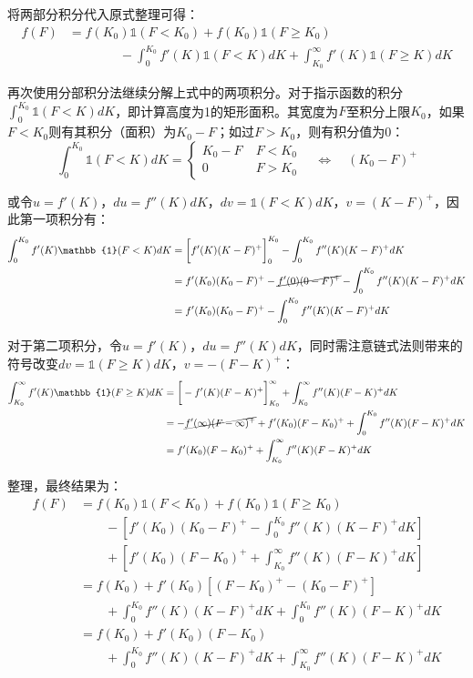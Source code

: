 \documentclass[11pt]{article}
\begin{document}
将两部分积分代入原式整理可得：
\begin{align*}
    f(F) &=  f(K_0)\mathbb{1}(F<K_0) + f(K_0)\mathbb{1}(F \geq K_0) \\
    &\hspace{4em} - \int^{K_0}_{0} f'(K) \mathbb{1}(F<K) dK 
    + \int^{\infty}_{K_0} f'(K) \mathbb{1}(F \geq K) dK
\end{align*}

再次使用分部积分法继续分解上式中的两项积分。对于指示函数的积分$\int^{K_0}_{0}\mathbb{1}(F<K) dK$，即计算高度为1的矩形面积。其宽度为$F$至积分上限$K_0$，如果$F<K_0$则有其积分（面积）为$K_0-F$；如过$F>K_0$，则有积分值为0：
\begin{equation*}
    \int^{K_0}_{0}\mathbb{1}(F<K) dK =
    \begin{cases}
        K_0 - F \; & F<K_0 \\
        0 \; & F>K_0
    \end{cases}
    \quad \Leftrightarrow \quad
    (K_0 - F)^+
\end{equation*}

或令$u=f'(K)$，$du=f''(K)dK$，$dv=\mathbb{1}(F<K)dK$，$v=(K-F)^+$，因此第一项积分有：
\begin{align*}
    \int^{K_0}_{0} f'(K) \mathbb{1}(F<K) dK 
    &= \bigg[ f'(K)(K-F)^+ \bigg]^{K_0}_{0} - \int^{K_0}_{0} f''(K) (K-F)^+ dK \\
    &= f'(K_0)(K_0-F)^+ - \cancel{f'(0)(0-F)^+} - \int^{K_0}_{0} f''(K) (K-F)^+ dK \\
    &= f'(K_0)(K_0 - F)^+ - \int^{K_0}_{0} f''(K) (K-F)^+ dK
\end{align*}

对于第二项积分，令$u=f'(K)$，$du=f''(K)dK$，同时需注意链式法则带来的符号改变$dv=\mathbb{1}(F \geq K)dK$，$v=-(F-K)^+$：
\begin{align*}
    \int^{\infty}_{K_0} f'(K) \mathbb{1}(F\geq K) dK 
    &= \bigg[ -f'(K)(F-K)^+ \bigg]^{\infty}_{K_0} + \int^{\infty}_{K_0} f''(K) (F-K)^+ dK \\
    &= - \cancel{f'(\infty)(F - \infty)^+} + f'(K_0)(F - K_0)^+ + \int^{K_0}_{0} f''(K) (F-K)^+ dK \\
    &= f'(K_0)(F - K_0)^+ + \int^{\infty}_{K_0} f''(K) (F-K)^+ dK
\end{align*}

整理，最终结果为：
\begin{align*}
    f(F) &= f(K_0)\mathbb{1}(F<K_0) + f(K_0)\mathbb{1}(F \geq K_0) \\
    &\qquad - \left[ f'(K_0)(K_0 - F)^+ - \int^{K_0}_{0} f''(K) (K-F)^+ dK \right] \\
    &\qquad + \left[ f'(K_0)(F - K_0)^+ + \int^{\infty}_{K_0} f''(K) (F-K)^+ dK \right] \\
    & = f(K_0) + f'(K_0) \left[ (F-K_0)^+ - (K_0 - F)^+ \right] \\
    &\qquad + \int^{K_0}_{0} f''(K) (K-F)^+ dK + \int^{K_0}_{0} f''(K) (F-K)^+ dK \\
    & = f(K_0) + f'(K_0) (F-K_0) \\
    &\qquad + \int^{K_0}_{0} f''(K) (K-F)^+ dK + \int^{\infty}_{K_0} f''(K) (F-K)^+ dK
\end{align*}
\end{document}
